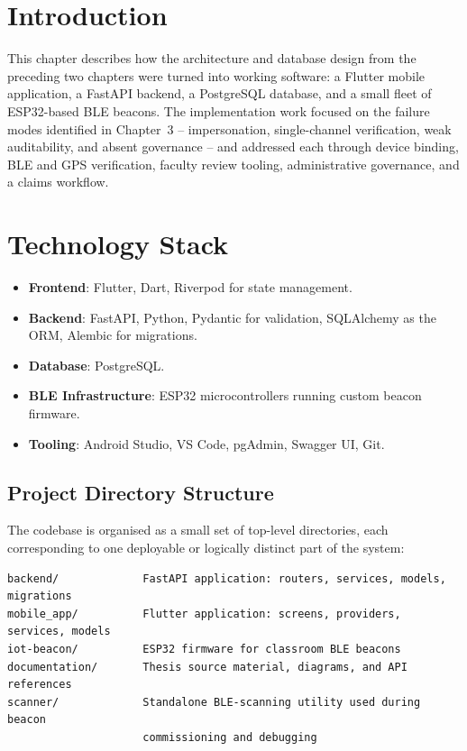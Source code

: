 \documentclass[12pt, a4paper, oneside]{report}
\begin{document}
\section{Introduction}

This chapter describes how the architecture and database design from the preceding two chapters were turned into working software: a Flutter mobile application, a FastAPI backend, a PostgreSQL database, and a small fleet of ESP32-based BLE beacons. The implementation work focused on the failure modes identified in Chapter~3 -- impersonation, single-channel verification, weak auditability, and absent governance -- and addressed each through device binding, BLE and GPS verification, faculty review tooling, administrative governance, and a claims workflow.

\section{Technology Stack}
\begin{itemize}
    \item \textbf{Frontend}: Flutter, Dart, Riverpod for state management.
    \item \textbf{Backend}: FastAPI, Python, Pydantic for validation, SQLAlchemy as the ORM, Alembic for migrations.
    \item \textbf{Database}: PostgreSQL.
    \item \textbf{BLE Infrastructure}: ESP32 microcontrollers running custom beacon firmware.
    \item \textbf{Tooling}: Android Studio, VS Code, pgAdmin, Swagger UI, Git.
\end{itemize}

\subsection{Project Directory Structure}

The codebase is organised as a small set of top-level directories, each corresponding to one deployable or logically distinct part of the system:

\begin{lstlisting}
backend/             FastAPI application: routers, services, models, migrations
mobile_app/          Flutter application: screens, providers, services, models
iot-beacon/          ESP32 firmware for classroom BLE beacons
documentation/       Thesis source material, diagrams, and API references
scanner/             Standalone BLE-scanning utility used during beacon
                     commissioning and debugging
\end{lstlisting}
\end{document}
